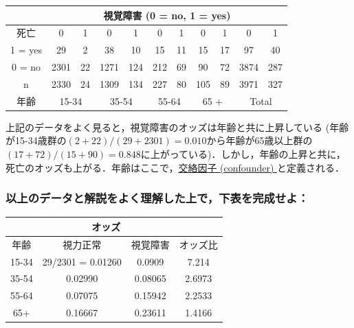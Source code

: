 \documentclass[]{problemset}
\begin{document}
\begin{center}
\begin{tabular}{|c|c|c|c|c|c|c|c|c|c|c|}
\hline
       & \multicolumn{10}{c|}{視覚障害 (0 = no, 1 = yes)}                                                                                                  \\ \hline
死亡     & 0             & 1          & 0            & 1           & 0            & 1           & 0           & 1           & 0            & 1           \\ \hline
1 = yes & 29            & 2          & 38           & 10          & 15           & 11          & 15          & 17          & 97           & 40          \\ \hline
0 = no & 2301          & 22         & 1271         & 124         & 212          & 69          & 90          & 72          & 3874         & 287         \\ \hline
  n     & 2330          &  24         & 1309         & 134         & 227          & 80          & 105          & 89          & 3971         & 327         \\ \hline
年齢     & \multicolumn{2}{c|}{15-34} & \multicolumn{2}{c|}{35-54} & \multicolumn{2}{c|}{55-64} & \multicolumn{2}{c|}{65 +} & \multicolumn{2}{c|}{Total} \\ \hline
\end{tabular}
\end{center}

上記のデータをよく見ると，視覚障害のオッズは年齢と共に上昇している
(年齢が15-34歳群の\((2 + 22) / (29 + 2301) = 0.010\)から年齢が65歳以上群の\((17+72)/(15+90) = 0.848\)に上がっている)．しかし，年齢の上昇と共に，死亡のオッズも上がる．年齢はここで，\underline{交絡因子 (confounder) }と定義される．

\subsubsection{以上のデータと解説をよく理解した上で，下表を完成せよ：}

\begin{center}
\begin{tabular}{|c|c|c|c|}
\hline
      & \multicolumn{2}{c|}{オッズ}    &        \\ \hline
年齢    & 視力正常              & 視覚障害    & オッズ比   \\ \hline
15-34 & 29/2301 = 0.01260 & 0.0909  & 7.214  \\ \hline
35-54 & 0.02990           & 0.08065 & 2.6973 \\ \hline
55-64 & 0.07075           & 0.15942 & 2.2533 \\ \hline
65+   & 0.16667           & 0.23611 & 1.4166 \\ \hline
\end{tabular}
\end{center}
\end{document}
